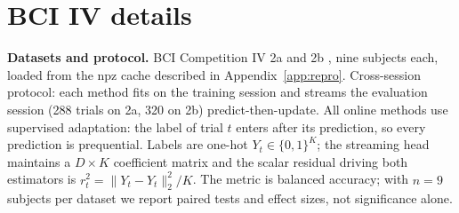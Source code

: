 \section{BCI IV details}
\label{app:eeg}
\setcounter{figure}{0}\setcounter{table}{0}

\textbf{Datasets and protocol.}
BCI Competition IV 2a \citep{brunner2008bci2a} and 2b \citep{leeb2008bci2b}, nine subjects each, loaded from the npz cache described in Appendix~\ref{app:repro}.
Cross-session protocol: each method fits on the training session and streams the evaluation session (288 trials on 2a, 320 on 2b) predict-then-update.
All online methods use supervised adaptation: the label of trial $t$ enters after its prediction, so every prediction is prequential.
Labels are one-hot $Y_t \in \{0,1\}^K$; the streaming head maintains a $D \times K$ coefficient matrix and the scalar residual driving both estimators is $r_t^2 = \|Y_t - \widehat Y_t\|_2^2/K$.
The metric is balanced accuracy; with $n = 9$ subjects per dataset we report paired tests and effect sizes, not significance alone.

